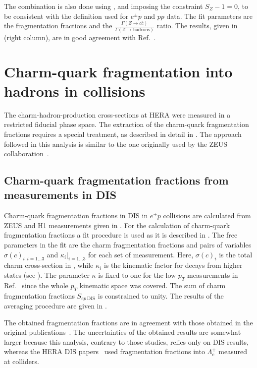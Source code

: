 The combination is also done using , and imposing 
the constraint $S_{Z}-1=0$, to be consistent with the definition 
used for $e^{\pm}p$ and $pp$ data. The fit parameters are the 
fragmentation 
fractions and the $\frac{\Gamma(Z \rightarrow c\bar{c})}{\Gamma(Z 
\rightarrow \text{hadrons})}$ ratio. The results, given in 
 (right column), 
are in good agreement with Ref.~\cite{Gladilin:2014tba}.
\FloatBarrier
\section{Charm-quark fragmentation into hadrons in {\pmb\ep} collisions}
\label{sec:ffep}
The charm-hadron-production cross-sections at HERA were measured in a 
restricted fiducial phase space. 
%
The extraction of the charm-quark fragmentation fractions  requires a 
special treatment, as described 
in detail in .
The approach followed in this analysis is  similar to the one originally 
used by the ZEUS collaboration~\cite{Chekanov:2005mm}.
\FloatBarrier
\subsection{Charm-quark fragmentation fractions from measurements in 
DIS}
Charm-quark fragmentation fractions in DIS in $e^{\pm}p$ collisions are 
calculated from ZEUS and H1 measurements given in .
\FloatBarrier
\tabDISmeas
For the calculation of charm-quark fragmentation fractions a fit 
procedure is used as it is described in .
The free parameters in the fit are the charm fragmentation fractions
and  pairs  of variables $\sigma(c)_{i}|_{i=1\dots 3}$ and 
$\kappa_{i}|_{i=1\dots 3}$ for each set of measurement. 
%
Here, $\sigma(c)_{i}$ is the total charm cross-section in \ep, while 
$\kappa_{i}$ is the kinematic factor for decays from higher states 
(see ). 
%
The parameter $\kappa$ is fixed to one for the low-$p_T$ measurements 
in Ref.~\cite{Abramowicz:2010aa} since the whole $p_T$ kinematic space 
was covered.
The sum of charm fragmentation fractions $S_{ep~\text{DIS}}$ is 
constrained to unity.
The results of the averaging procedure are given in .
\tabDISaverage

The obtained fragmentation fractions are in agreement with those 
obtained in the original publications~\cite{Chekanov:2007ch,
Aktas:2004ka}. 
%
The uncertainties of the obtained results  are somewhat larger  because 
this analysis, contrary to those studies, relies only on DIS results, 
whereas the HERA DIS papers~\cite{Chekanov:2007ch,
Aktas:2004ka} used fragmentation fractions into 
$\Lambda_{c}^{+}$ measured at \epem colliders.
\FloatBarrier
